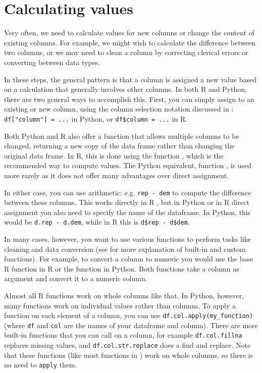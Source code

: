 \section{Calculating values}
\label{sec:calculate}

Very often, we need to calculate values for new columns or change the content of existing columns.
For example, we might wish to calculate the difference between two columns,
or we may need to clean a column by correcting clerical errors or converting between data types.

In these steps, the general pattern is that a column is assigned a new value based on
a calculation that generally involves other columns.
In both R and Python, there are two general ways to accomplish this.
First, you can simply assign to an existing or new column,
using the column selection notation discussed in :
\verb+df["column"] = ...+ in Python, or \verb+df$column = ...+ in R.

Both Python and R also offer a function that allows multiple columns to be changed,
returning a new copy of the data frame rather than changing the original data frame.
In R, this is done using the  function , which is the recommended way to compute values.
The Python equivalent,  function , is used more rarely as it does not offer many advantages over direct assignment.

In either case, you can use arithmetic: e.g. \verb|rep - dem| to compute the difference between these columns.
This works directly in R ,
but in Python or in R direct assignment you also need to specify the name of the dataframe.
In Python, this would be \verb+d.rep - d.dem+, while in R this is \verb+d$rep - d$dem+. 

In many cases, however, you want to use various functions to perform tasks like cleaning and data conversion
(see  for more explanation of built-in and custom functions).
For example, to convert a column to numeric you would use the base R function  in R or the  function  in Python.
Both functions take a column as argument and convert it to a numeric column.

Almost all R functions work on whole columns like that.
In Python, however, many functions work on individual values rather than columns.
To apply a function on each element of a column, you can use \verb+df.col.apply(my_function)+
(where \texttt{df} and \texttt{col} are the names of your dataframe and column). 
There are more built-in functions that you can call on a column, for example \verb+df.col.fillna+ replaces
missing values, and \verb+df.col.str.replace+ does a find and replace.
Note that these functions (like most functions in ) work on whole columns,
so there is no need to \verb+apply+ them. 

